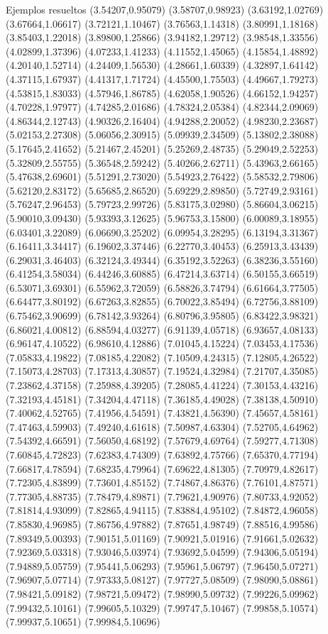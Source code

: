 \documentclass[11pt,a4paper]{article}
\begin{document}
\begin{fmex}{Ejemplos resueltos}
(3.54207,0.95079) (3.58707,0.98923) (3.63192,1.02769) (3.67664,1.06617) (3.72121,1.10467) (3.76563,1.14318) (3.80991,1.18168) (3.85403,1.22018) (3.89800,1.25866) (3.94182,1.29712) (3.98548,1.33556) (4.02899,1.37396) (4.07233,1.41233) (4.11552,1.45065) (4.15854,1.48892) (4.20140,1.52714) (4.24409,1.56530) (4.28661,1.60339) (4.32897,1.64142) (4.37115,1.67937) (4.41317,1.71724) (4.45500,1.75503) (4.49667,1.79273) (4.53815,1.83033) (4.57946,1.86785) (4.62058,1.90526) (4.66152,1.94257) (4.70228,1.97977) (4.74285,2.01686) (4.78324,2.05384) (4.82344,2.09069) (4.86344,2.12743) (4.90326,2.16404) (4.94288,2.20052) (4.98230,2.23687) (5.02153,2.27308) (5.06056,2.30915) (5.09939,2.34509) (5.13802,2.38088) (5.17645,2.41652) (5.21467,2.45201) (5.25269,2.48735) (5.29049,2.52253) (5.32809,2.55755) (5.36548,2.59242) (5.40266,2.62711) (5.43963,2.66165) (5.47638,2.69601) (5.51291,2.73020) (5.54923,2.76422) (5.58532,2.79806) (5.62120,2.83172) (5.65685,2.86520) (5.69229,2.89850) (5.72749,2.93161) (5.76247,2.96453) (5.79723,2.99726) (5.83175,3.02980) (5.86604,3.06215) (5.90010,3.09430) (5.93393,3.12625) (5.96753,3.15800) (6.00089,3.18955) (6.03401,3.22089) (6.06690,3.25202) (6.09954,3.28295) (6.13194,3.31367) (6.16411,3.34417) (6.19602,3.37446) (6.22770,3.40453) (6.25913,3.43439) (6.29031,3.46403) (6.32124,3.49344) (6.35192,3.52263) (6.38236,3.55160) (6.41254,3.58034) (6.44246,3.60885) (6.47214,3.63714) (6.50155,3.66519) (6.53071,3.69301) (6.55962,3.72059) (6.58826,3.74794) (6.61664,3.77505) (6.64477,3.80192) (6.67263,3.82855) (6.70022,3.85494) (6.72756,3.88109) (6.75462,3.90699) (6.78142,3.93264) (6.80796,3.95805) (6.83422,3.98321) (6.86021,4.00812) (6.88594,4.03277) (6.91139,4.05718) (6.93657,4.08133) (6.96147,4.10522) (6.98610,4.12886) (7.01045,4.15224) (7.03453,4.17536) (7.05833,4.19822) (7.08185,4.22082) (7.10509,4.24315) (7.12805,4.26522) (7.15073,4.28703) (7.17313,4.30857) (7.19524,4.32984) (7.21707,4.35085) (7.23862,4.37158) (7.25988,4.39205) (7.28085,4.41224) (7.30153,4.43216) (7.32193,4.45181) (7.34204,4.47118) (7.36185,4.49028) (7.38138,4.50910) (7.40062,4.52765) (7.41956,4.54591) (7.43821,4.56390) (7.45657,4.58161) (7.47463,4.59903) (7.49240,4.61618) (7.50987,4.63304) (7.52705,4.64962) (7.54392,4.66591) (7.56050,4.68192) (7.57679,4.69764) (7.59277,4.71308) (7.60845,4.72823) (7.62383,4.74309) (7.63892,4.75766) (7.65370,4.77194) (7.66817,4.78594) (7.68235,4.79964) (7.69622,4.81305) (7.70979,4.82617) (7.72305,4.83899) (7.73601,4.85152) (7.74867,4.86376) (7.76101,4.87571) (7.77305,4.88735) (7.78479,4.89871) (7.79621,4.90976) (7.80733,4.92052) (7.81814,4.93099) (7.82865,4.94115) (7.83884,4.95102) (7.84872,4.96058) (7.85830,4.96985) (7.86756,4.97882) (7.87651,4.98749) (7.88516,4.99586) (7.89349,5.00393) (7.90151,5.01169) (7.90921,5.01916) (7.91661,5.02632) (7.92369,5.03318) (7.93046,5.03974) (7.93692,5.04599) (7.94306,5.05194) (7.94889,5.05759) (7.95441,5.06293) (7.95961,5.06797) (7.96450,5.07271) (7.96907,5.07714) (7.97333,5.08127) (7.97727,5.08509) (7.98090,5.08861) (7.98421,5.09182) (7.98721,5.09472) (7.98990,5.09732) (7.99226,5.09962) (7.99432,5.10161) (7.99605,5.10329) (7.99747,5.10467) (7.99858,5.10574) (7.99937,5.10651) (7.99984,5.10696) 
\end{fmex}
\end{document}
